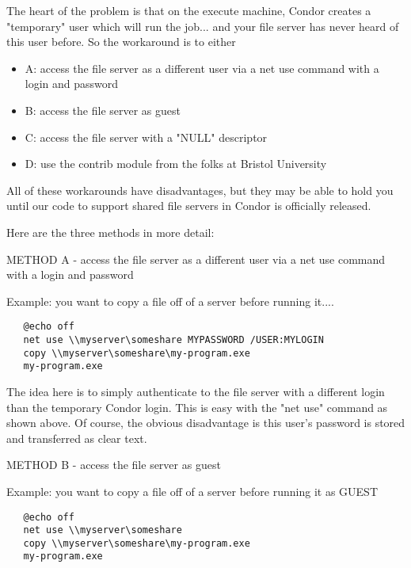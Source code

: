 The heart of the problem is that on the execute machine, Condor creates a 
"temporary" user which will run the job... and your file server has never 
heard of this user before.  So the workaround is to either

\begin{itemize}
\item A: access the file server as a different user via a net use command with a 
login and password
\item B: access the file server as guest
\item C: access the file server with a "NULL" descriptor
\item D: use the contrib module from the folks at Bristol University
\end{itemize}

All of these workarounds have disadvantages, but they may be able to hold 
you until our code to support shared file servers in Condor is officially 
released.

Here are the three methods in more detail:

METHOD A - access the file server as a different user via a net use command 
with a login and password

Example: you want to copy a file off of a server before running it....

\footnotesize
\begin{verbatim}
   @echo off
   net use \\myserver\someshare MYPASSWORD /USER:MYLOGIN
   copy \\myserver\someshare\my-program.exe
   my-program.exe
\end{verbatim}
\normalsize

The idea here is to simply authenticate to the file server with a different 
login than the temporary Condor login.  This is easy with the "net use" 
command as shown above.  Of course, the obvious disadvantage is this user's 
password is stored and transferred as clear text.

METHOD B - access the file server as guest

Example: you want to copy a file off of a server before running it as GUEST

\begin{verbatim}
   @echo off
   net use \\myserver\someshare
   copy \\myserver\someshare\my-program.exe
   my-program.exe
\end{verbatim}

